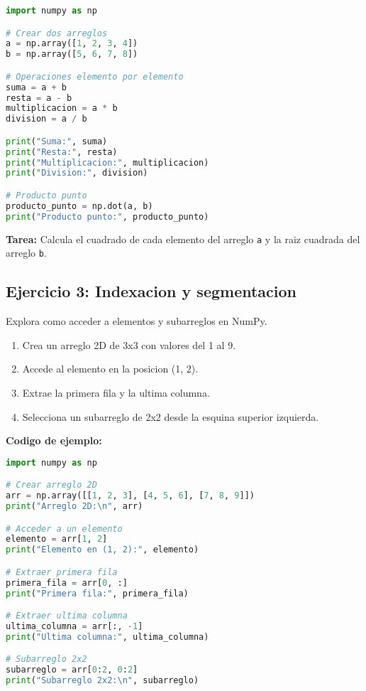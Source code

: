 \documentclass[a4paper,12pt]{article}
\begin{document}
\begin{lstlisting}[language=Python]
import numpy as np

# Crear dos arreglos
a = np.array([1, 2, 3, 4])
b = np.array([5, 6, 7, 8])

# Operaciones elemento por elemento
suma = a + b
resta = a - b
multiplicacion = a * b
division = a / b

print("Suma:", suma)
print("Resta:", resta)
print("Multiplicacion:", multiplicacion)
print("Division:", division)

# Producto punto
producto_punto = np.dot(a, b)
print("Producto punto:", producto_punto)
\end{lstlisting}

\textbf{Tarea:} Calcula el cuadrado de cada elemento del arreglo \texttt{a} y la raiz cuadrada del arreglo \texttt{b}.

\subsection{Ejercicio 3: Indexacion y segmentacion}
Explora como acceder a elementos y subarreglos en NumPy.

\begin{enumerate}
    \item Crea un arreglo 2D de 3x3 con valores del 1 al 9.
    \item Accede al elemento en la posicion (1, 2).
    \item Extrae la primera fila y la ultima columna.
    \item Selecciona un subarreglo de 2x2 desde la esquina superior izquierda.
\end{enumerate}

\textbf{Codigo de ejemplo:}

\begin{lstlisting}[language=Python]
import numpy as np

# Crear arreglo 2D
arr = np.array([[1, 2, 3], [4, 5, 6], [7, 8, 9]])
print("Arreglo 2D:\n", arr)

# Acceder a un elemento
elemento = arr[1, 2]
print("Elemento en (1, 2):", elemento)

# Extraer primera fila
primera_fila = arr[0, :]
print("Primera fila:", primera_fila)

# Extraer ultima columna
ultima_columna = arr[:, -1]
print("Ultima columna:", ultima_columna)

# Subarreglo 2x2
subarreglo = arr[0:2, 0:2]
print("Subarreglo 2x2:\n", subarreglo)
\end{lstlisting}
\end{document}
